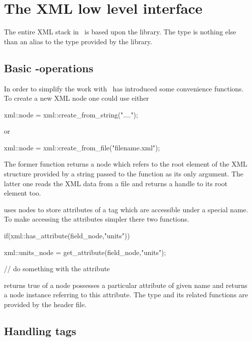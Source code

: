 {%
\section{The XML low level interface}\label{sec:xml:lowlevel}

The entire XML stack in \libpniio\ is based upon the  
library. The  type is nothing else than an alias to
the  type provided by the  library.

\subsection{Basic -operations}

In order to simplify the work with  \libpniio\ has
introduced some convenience functions. 
To create a new XML node one could use either 
\begin{cppcode}
xml::node = xml::create_from_string("....");
\end{cppcode}
or
\begin{cppcode}
xml::node = xml::create_from_file("filename.xml");
\end{cppcode}
The former function returns a node which refers to the root element of the 
XML structure provided by a string passed to the function as its only argument. 
The latter one reads the XML data from a file and returns a handle to its 
root element too.

 uses nodes to store attributes of a tag which are 
accessible under a special name. To make accessing the attributes simpler 
there two functions.  
\begin{cppcode}
if(xml::has_attribute(field_node,"units"))
{
    xml::units_node = get_attribute(field_node,"units");

    // do something with the attribute
}
\end{cppcode}
 returns true of a node possesses a particular attribute of
given name and  returns a node instance referring to this 
attribute. 
The  type and its related functions are provided by the
 header file.

\subsection{Handling tags}

}
